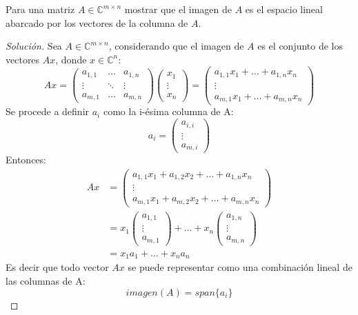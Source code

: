 \documentclass[12pt]{book}
\newcommand{\C}{\mathbb{C}}
\newenvironment{solucion}
  {\renewcommand\qedsymbol{$\square$}\begin{proof}[Solución]}
  {\end{proof}}
\begin{document}
\eje Para una matriz $A\in\C^{m\times n}$ mostrar que el imagen de $A$ es el espacio lineal abarcado por los vectores de la columna de $A$.
\begin{solucion}
Sea $A\in\C^{m\times n}$, considerando que el imagen de $A$ es el conjunto de los vectores $Ax$, donde $x\in\C^n$:
    \[
        Ax=\begin{pmatrix}
            a_{1, 1} & \dots & a_{1, n}\\
            \vdots & \ddots & \vdots\\
            a_{m, 1} & \dots & a_{m, n}
        \end{pmatrix}
        \begin{pmatrix}
            x_1\\
            \vdots\\
            x_n
        \end{pmatrix}
        =
        \begin{pmatrix}
            a_{1,1}x_1+\dots+a_{1,n}x_n\\
            \vdots\\
            a_{m,1}x_1+\dots+a_{m,n}x_n
        \end{pmatrix}
    \]
Se procede a definir $a_i$ como la i-ésima columna de A:
    \[
        a_i=\begin{pmatrix}
            a_{i, i}\\
            \vdots\\
            a_{m, i}
        \end{pmatrix}
    \]
Entonces:
\begin{align*}
    Ax&=\begin{pmatrix}
    a_{1,1}x_1+a_{1,2}x_2+\dots+a_{1,n}x_n\\
    \vdots\\
    a_{m,1}x_1+a_{m,2}x_2+\dots+a_{m,n}x_n
    \end{pmatrix}\\
    &= x_1\begin{pmatrix}
    a_{1, 1}\\
    \vdots\\
    a_{m, 1}
    \end{pmatrix} + \dots + x_n\begin{pmatrix}
    a_{1, n}\\
    \vdots\\
    a_{m, n}
    \end{pmatrix}\\
    &=x_1a_1+\dots+x_na_n
\end{align*}
Es decir que todo vector $Ax$ se puede representar como una combinación lineal de las columnas de A:
    \[
    imagen(A)=span\{a_i\}
    \]
\end{solucion}
\end{document}

